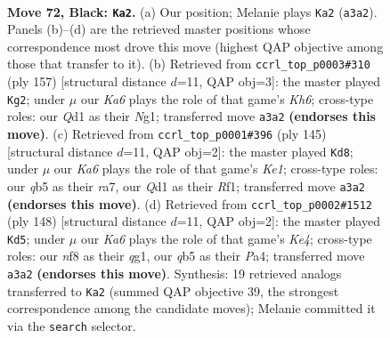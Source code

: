 \documentclass[11pt]{article}
\begin{document}
\clearpage

\begin{figure}[p]\centering
\begin{subfigure}{0.46\textwidth}\centering
\resizebox{\linewidth}{!}{%
\newchessgame
\chessboard[
  setfen={5N2/7K/8/1Q6/8/k7/8/3q4 b - - 14 72},
  showmover=false,
  pgfstyle=straightmove, color=movearrow, markmove={a3-a2}
]}
\caption{}
\end{subfigure}\hfill
\begin{subfigure}{0.46\textwidth}\centering
\resizebox{\linewidth}{!}{%
\newchessgame
\chessboard[
  setfen={2Q5/8/8/8/8/7k/1K6/3N2n1 b - - 0 79},
  showmover=false,
  pgfstyle=straightmove, color=movearrow, markmove={h3-g2}
]}
\caption{}
\end{subfigure}
\\[4pt]
\begin{subfigure}{0.46\textwidth}\centering
\resizebox{\linewidth}{!}{%
\newchessgame
\chessboard[
  setfen={4k3/R7/8/4p1K1/4N3/8/8/5r2 b - - 4 73},
  showmover=false,
  pgfstyle=straightmove, color=movearrow, markmove={e8-d8}
]}
\caption{}
\end{subfigure}\hfill
\begin{subfigure}{0.46\textwidth}\centering
\resizebox{\linewidth}{!}{%
\newchessgame
\chessboard[
  setfen={5Q2/8/8/p7/P3K3/8/8/4k1q1 w - - 1 75},
  showmover=false,
  pgfstyle=straightmove, color=movearrow, markmove={e4-d5}
]}
\caption{}
\end{subfigure}
\caption{\textbf{Move 72, Black: \texttt{Ka2}.} (a) Our position; Melanie plays \texttt{Ka2} (\texttt{a3a2}). Panels (b)--(d) are the retrieved master positions whose correspondence most drove this move (highest QAP objective among those that transfer to it). (b) Retrieved from \texttt{ccrl\_top\_p0003\#310} (ply 157) [structural distance $d$=11, QAP obj=3]: the master played \texttt{Kg2}; under $\mu$ our \emph{Ka6} plays the role of that game's \emph{Kh6}; cross-type roles: our \emph{Q}d1 as their \emph{N}g1; transferred move \texttt{a3a2} \textbf{(endorses this move)}. (c) Retrieved from \texttt{ccrl\_top\_p0001\#396} (ply 145) [structural distance $d$=11, QAP obj=2]: the master played \texttt{Kd8}; under $\mu$ our \emph{Ka6} plays the role of that game's \emph{Ke1}; cross-type roles: our \emph{q}b5 as their \emph{r}a7, our \emph{Q}d1 as their \emph{R}f1; transferred move \texttt{a3a2} \textbf{(endorses this move)}. (d) Retrieved from \texttt{ccrl\_top\_p0002\#1512} (ply 148) [structural distance $d$=11, QAP obj=2]: the master played \texttt{Kd5}; under $\mu$ our \emph{Ka6} plays the role of that game's \emph{Ke4}; cross-type roles: our \emph{n}f8 as their \emph{q}g1, our \emph{q}b5 as their \emph{P}a4; transferred move \texttt{a3a2} \textbf{(endorses this move)}. Synthesis: 19 retrieved analogs transferred to \texttt{Ka2} (summed QAP objective 39, the strongest correspondence among the candidate moves); Melanie committed it via the \texttt{search} selector.}
\label{fig:thought-m143}
\end{figure}
\end{document}
